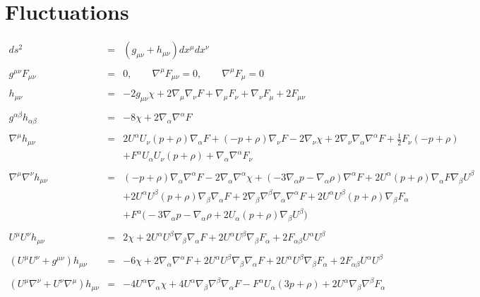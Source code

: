 \documentclass[10pt,letterpaper]{article}
\numberwithin{equation}{section}
\begin{document}
\section{Fluctuations}
%
%
\begin{eqnarray}
ds^2 &=& ( g_{\mu\nu}+ h_{\mu\nu}) dx^\mu dx^\nu
\\ \nonumber\\
g^{\mu\nu} F_{\mu\nu} &=&0,\qquad \nabla^\mu F_{\mu\nu} = 0,\qquad \nabla^\mu F_\mu=0 
\\ \nonumber\\
h_{\mu\nu} &=& -2 g_{\mu\nu}\chi + 2\nabla_\mu \nabla_\nu F +\nabla_\mu F_\nu +\nabla_\nu F_\mu+ 2F_{\mu\nu}
\label{svt}
\\ \nonumber\\
g^{\alpha\beta}h_{\alpha\beta} &=& -8\chi +2 \nabla_\alpha \nabla^\alpha F
\\ \nonumber\\
\nabla^\mu h_{\mu\nu} &=& 2 U^{\alpha } U_{\nu } (p + \rho) \nabla_{\alpha }F + (- p + \rho) \nabla_{\nu }F - 2 \nabla_{\nu }\chi + 2 \nabla_{\nu }\nabla_{\alpha }\nabla^{\alpha }F+\tfrac{1}{2} F_{\nu } (- p + \rho) \nonumber \\ 
&& + F^{\alpha } U_{\alpha } U_{\nu } (p + \rho) + \nabla_{\alpha }\nabla^{\alpha }F_{\nu }
\\ \nonumber\\
\nabla^\mu \nabla^\nu h_{\mu\nu} &=&  (- p + \rho) \nabla_{\alpha }\nabla^{\alpha }F - 2 \nabla_{\alpha }\nabla^{\alpha }\chi + (-3 \nabla_{\alpha }p -  \nabla_{\alpha }\rho) \nabla^{\alpha }F + 2 U^{\alpha } (p + \rho) \nabla_{\alpha }F \nabla_{\beta }U^{\beta } \nonumber \\ 
&& + 2 U^{\alpha } U^{\beta } (p + \rho) \nabla_{\beta }\nabla_{\alpha }F + 2 \nabla_{\beta }\nabla^{\beta }\nabla_{\alpha }\nabla^{\alpha }F+2 U^{\alpha } U^{\beta } (p + \rho) \nabla_{\beta }F_{\alpha } \nonumber \\ 
&& + F^{\alpha } \bigl(-3 \nabla_{\alpha }p -  \nabla_{\alpha }\rho + 2 U_{\alpha } (p + \rho) \nabla_{\beta }U^{\beta }\bigr)
\\ \nonumber\\
U^\mu U^\nu h_{\mu\nu} &=& 2 \chi + 2 U^{\alpha } U^{\beta } \nabla_{\beta }\nabla_{\alpha }F+2 U^{\alpha } U^{\beta } \nabla_{\beta }F_{\alpha }+2 F_{\alpha \beta } U^{\alpha } U^{\beta }
\\ \nonumber\\
(U^\mu U^\nu +g^{\mu\nu})h_{\mu\nu} &=& -6 \chi + 2 \nabla_{\alpha }\nabla^{\alpha }F + 2 U^{\alpha } U^{\beta } \nabla_{\beta }\nabla_{\alpha }F+2 U^{\alpha } U^{\beta } \nabla_{\beta }F_{\alpha }+2 F_{\alpha \beta } U^{\alpha } U^{\beta }
\\ \nonumber\\
(U^\mu \nabla^\nu + U^\nu \nabla^\mu)h_{\mu\nu} &=& -4 U^{\alpha } \nabla_{\alpha }\chi + 4 U^{\alpha } \nabla_{\beta }\nabla^{\beta }\nabla_{\alpha }F- F^{\alpha } U_{\alpha } (3 p + \rho) + 2 U^{\alpha } \nabla_{\beta }\nabla^{\beta }F_{\alpha }
\end{eqnarray}
\end{document}
